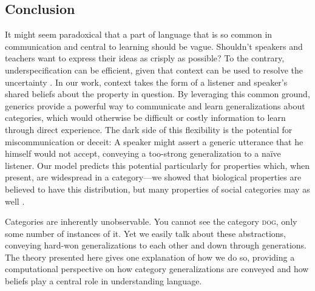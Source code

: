 \documentclass[12pt,letterpaper]{article}
\begin{document}

\subsection*{Conclusion}

It might seem paradoxical that a part of language that is so common in communication and central to learning should be vague. 
Shouldn't speakers and teachers want to express their ideas as crisply as possible?
To the contrary, underspecification can be efficient, given that context can be used to resolve the uncertainty \cite{Piantadosi2012}.
In our work, context takes the form of a listener and speaker's shared beliefs about the property in question. 
By leveraging this common ground, generics provide a powerful way to communicate and learn generalizations about categories, 
which would otherwise be difficult or costly information to learn through direct experience.
The dark side of this flexibility is the potential for miscommunication or deceit: A speaker might assert a generic utterance that he himself would not accept, conveying a too-strong generalization to a na\"{i}ve listener.  
Our model predicts this potential particularly for properties which, when present, are widespread in a category---we showed that biological properties are believed to have this distribution, but many properties of social categories may as well \cite{Cimpian2011a,Cimpian2012b,Rhodes2012}.


Categories are inherently unobservable. 
You cannot see the category \textsc{dog}, only some number of instances of it.
Yet we easily talk about these abstractions, conveying hard-won generalizations to each other and down through generations.
The theory presented here gives one explanation of how we do so, providing a computational perspective on how category generalizations are conveyed and how beliefs play a central role in understanding language.
\end{document}
